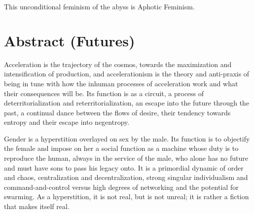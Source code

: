\documentclass[10pt, statementpaper, twoside, openright]{memoir}
\begin{document}
This unconditional feminism of the abyss is Aphotic Feminism.

\chapter{Abstract (Futures)}

Acceleration is the trajectory of the cosmos, towards the maximization and intensification of production, and accelerationism is the theory and anti-praxis of being in tune with how the inhuman processes of acceleration work and what their consequences will be. Its function is as a circuit, a process of deterritorialization and reterritorialization, an escape into the future through the past, a continual dance between the flows of desire, their tendency towards entropy and their escape into negentropy.

Gender is a hyperstition overlayed on sex by the male. Its function is to objectify the female and impose on her a social function as a machine whose duty is to reproduce the human, always in the service of the male, who alone has no future and must have sons to pass his legacy onto. It is a primordial dynamic of order and chaos, centralization and decentralization, strong singular individualism and command-and-control versus high degrees of networking and the potential for swarming. As a hyperstition, it is not real, but is not unreal; it is rather a fiction that makes itself real.
\end{document}
